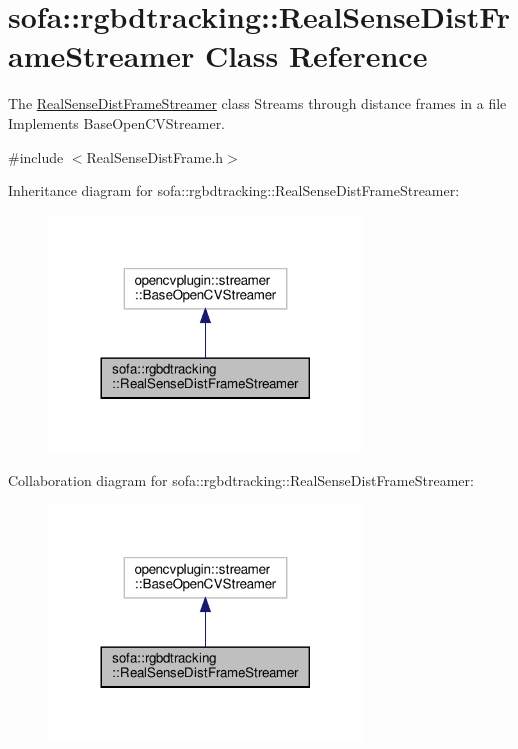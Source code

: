 \hypertarget{classsofa_1_1rgbdtracking_1_1_real_sense_dist_frame_streamer}{}\section{sofa\+:\+:rgbdtracking\+:\+:Real\+Sense\+Dist\+Frame\+Streamer Class Reference}
\label{classsofa_1_1rgbdtracking_1_1_real_sense_dist_frame_streamer}


The \hyperlink{classsofa_1_1rgbdtracking_1_1_real_sense_dist_frame_streamer}{Real\+Sense\+Dist\+Frame\+Streamer} class Streams through distance frames in a file Implements Base\+Open\+C\+V\+Streamer.  




{\ttfamily \#include $<$Real\+Sense\+Dist\+Frame.\+h$>$}



Inheritance diagram for sofa\+:\+:rgbdtracking\+:\+:Real\+Sense\+Dist\+Frame\+Streamer\+:\nopagebreak
\begin{figure}[H]
\begin{center}
\leavevmode
\includegraphics[width=236pt]{classsofa_1_1rgbdtracking_1_1_real_sense_dist_frame_streamer__inherit__graph}
\end{center}
\end{figure}


Collaboration diagram for sofa\+:\+:rgbdtracking\+:\+:Real\+Sense\+Dist\+Frame\+Streamer\+:\nopagebreak
\begin{figure}[H]
\begin{center}
\leavevmode
\includegraphics[width=236pt]{classsofa_1_1rgbdtracking_1_1_real_sense_dist_frame_streamer__coll__graph}
\end{center}
\end{figure}
